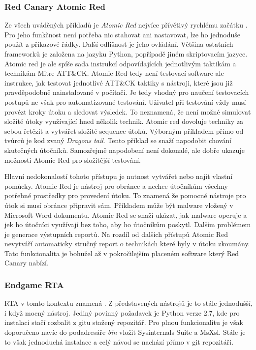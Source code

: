 \subsubsection{Red Canary Atomic Red}
Ze všech uváděných příkladů je \textit{Atomic Red} nejvíce přívětivý rychlému začátku .
Pro jeho funkčnost není potřeba nic stahovat ani nastavovat, lze ho jednoduše použít z příkazové řádky\cite{redcanary_atomic_red}.
Další odlišnost je jeho ovládání.
Většina ostatních frameworků je založena na jazyku Python, popřípadě jiném skriptovacím jazyce.
Atomic red je ale spíše sada instrukcí odpovídajících jednotlivým taktikám a technikám Mitre ATT\&CK\@.
Atomic Red tedy není testovací software ale instrukce, jak testovat jednotlivé ATT\&CK taktiky s nástroji, které jsou již pravděpodobně nainstalované v počítači.
Je tedy vhodný pro naučení testovacích postupů ne však pro automatizované testování.
Uživatel při testování vždy musí provézt kroky útoku a sledovat výsledek.
To neznamená, že není možné simulovat složité útoky využívající hned několik technik.
Atomic red dovoluje techniky za sebou řetězit a vytvářet složité sequence útoků.
Výborným příkladem přímo od tvůrců je kod zvaný \textit{Dragons tail}\cite{redcanary_dragons_tail}.
Tento příklad se snaží napodobit chování skutečných útočníků.
Samozřejmě napodobení není dokonalé, ale dobře ukazuje možnosti Atomic Red pro složitější testování.\cite{csoonline_4_testing_frameworks}

Hlavní nedokonalostí tohoto přístupu je nutnost vytvářet nebo najít vlastní pomůcky.
Atomic Red je nástroj pro obránce a nechce útočníkům všechny potřebné prostředky pro provedení útoku.
To znamená že pomocné nástroje pro útok si musí obránce připravit sám.
Příkladem může být malware vložený v Microsoft Word dokumentu.
Atomic Red se snaží ukázat, jak malware operuje a jek ho útočníci využívají bez toho, aby ho útočníkům poskytl.
Dalším problémem je generace výstupních reportů.
Na rozdíl od dalších přístupů Atomic Red nevytváří automaticky stručný report o technikách které byly v útoku zkoumány.
Tato funkcionalita je bohužel až v pokročilejším placeném software který Red Canary nabízí.\cite{csoonline_4_testing_frameworks}


\subsubsection{Endgame RTA}
\ac{RTA} v tomto kontextu znamená .
Z představených nástrojů je to stále jednodušší, i když mocný nástroj.
Jediný povinný požadavek je Python verze 2.7, kde pro instalaci stačí rozbalit z gitu stažený repozitář.
Pro plnou funkcionalitu je však doporučeno navíc do podadresáře \textit{bin} vložit Sysinternals Suite a MsXsl.
Stále je to však jednoduchá instalace a celý návod se nachází přímo v git repozitáři.\cite{endgame_rta}

